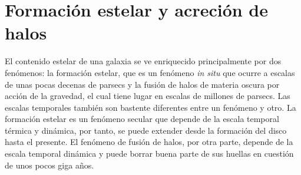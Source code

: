 \documentclass{article}
\begin{document}
\section{Formación estelar y acreción de halos}
%
El contenido estelar de una galaxia se ve enriquecido principalmente por dos fenómenos: la formación
estelar, que es un fenómeno \emph{in situ} que ocurre a escalas de unas pocas decenas de parsecs
y la fusión de halos de materia oscura por acción de la gravedad, el cual tiene lugar en escalas de
millones de parsecs.
Las escalas temporales también son bastente diferentes entre un fenómeno y otro. La formación
estelar es un fenómeno secular que depende de la escala temporal térmica y dinámica, por tanto, se
puede extender desde la formación del disco hasta el presente. El fenómeno de fusión de halos, por
otra parte, depende de la escala temporal dinámica y puede borrar buena parte de sus huellas en
cuestión de unos pocos giga años.
\end{document}
